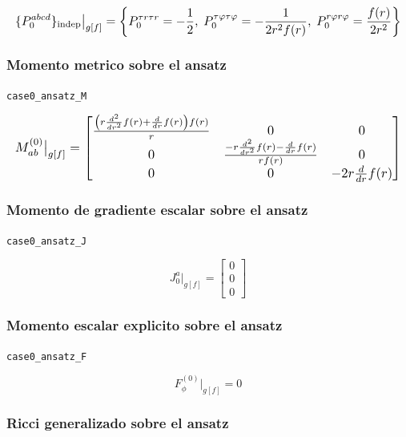 \documentclass[11pt,a4paper]{article}
\begin{document}
\[
\resizebox{\textwidth}{!}{$\displaystyle \{P_0^{abcd}\}_{\mathrm{indep}}\big|_{g[f]} = \left\{P_0^{{\tau}{r}{\tau}{r}}=- \frac{1}{2},\;P_0^{{\tau}{\varphi}{\tau}{\varphi}}=- \frac{1}{2 r^{2} f{\left(r \right)}},\;P_0^{{r}{\varphi}{r}{\varphi}}=\frac{f{\left(r \right)}}{2 r^{2}}\right\}$}
\]

\subsubsection{Momento metrico sobre el ansatz}

\noindent\texttt{case0\_ansatz\_M}\par\nopagebreak[4]

\[
\resizebox{\textwidth}{!}{$\displaystyle M^{(0)}_{ab}\big|_{g[f]} = \left[\begin{matrix}\frac{\left(r \frac{d^{2}}{d r^{2}} f{\left(r \right)} + \frac{d}{d r} f{\left(r \right)}\right) f{\left(r \right)}}{r} & 0 & 0\\0 & \frac{- r \frac{d^{2}}{d r^{2}} f{\left(r \right)} - \frac{d}{d r} f{\left(r \right)}}{r f{\left(r \right)}} & 0\\0 & 0 & - 2 r \frac{d}{d r} f{\left(r \right)}\end{matrix}\right]$}
\]

\subsubsection{Momento de gradiente escalar sobre el ansatz}

\noindent\texttt{case0\_ansatz\_J}\par\nopagebreak[4]

\[
J_0^a\big|_{g[f]} = \left[\begin{matrix}0\\0\\0\end{matrix}\right]
\]

\subsubsection{Momento escalar explicito sobre el ansatz}

\noindent\texttt{case0\_ansatz\_F}\par\nopagebreak[4]

\[
F_\phi^{(0)}\big|_{g[f]} = 0
\]

\subsubsection{Ricci generalizado sobre el ansatz}
\end{document}
